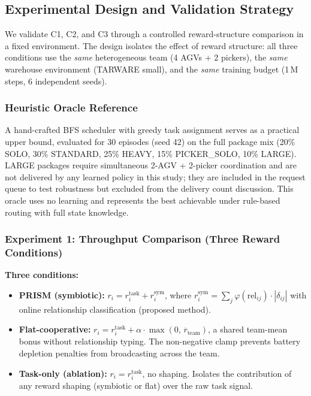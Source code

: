 \documentclass[Afour,sageh,times]{sagej}
\begin{document}


\subsection{Experimental Design and Validation Strategy}
\label{sec:exp}

We validate C1, C2, and C3 through a controlled reward-structure comparison in a fixed environment. The design isolates the effect of reward structure: all three conditions use the \emph{same} heterogeneous team (4 AGVs + 2 pickers), the \emph{same} warehouse environment (TARWARE small), and the \emph{same} training budget (1\,M steps, 6 independent seeds).

\subsubsection{Heuristic Oracle Reference}

A hand-crafted BFS scheduler with greedy task assignment serves as a practical upper bound, evaluated for 30 episodes (seed 42) on the full package mix (20\% SOLO, 30\% STANDARD, 25\% HEAVY, 15\% PICKER\_SOLO, 10\% LARGE). LARGE packages require simultaneous 2-AGV + 2-picker coordination and are not delivered by any learned policy in this study; they are included in the request queue to test robustness but excluded from the delivery count discussion. This oracle uses no learning and represents the best achievable under rule-based routing with full state knowledge.

\subsubsection{Experiment 1: Throughput Comparison (Three Reward Conditions)}

\textbf{Three conditions:}
\begin{itemize}
    \item \textbf{PRISM (symbiotic):} $r_i = r_i^{\mathrm{task}} + r_i^{\mathrm{sym}}$, where $r_i^{\mathrm{sym}} = \sum_j \varphi(\mathrm{rel}_{ij}) \cdot |\delta_{ij}|$ with online relationship classification (proposed method).
    \item \textbf{Flat-cooperative:} $r_i = r_i^{\mathrm{task}} + \alpha \cdot \max(0,\, \overline{r}_{\mathrm{team}})$, a shared team-mean bonus without relationship typing. The non-negative clamp prevents battery depletion penalties from broadcasting across the team.
    \item \textbf{Task-only (ablation):} $r_i = r_i^{\mathrm{task}}$, no shaping. Isolates the contribution of any reward shaping (symbiotic or flat) over the raw task signal.
\end{itemize}
\end{document}
